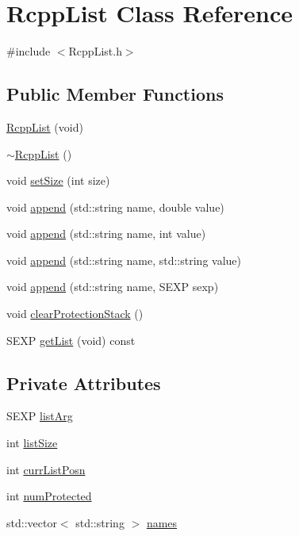 \hypertarget{classRcppList}{
\section{RcppList Class Reference}
\label{classRcppList}
}


{\ttfamily \#include $<$RcppList.h$>$}\subsection*{Public Member Functions}
\begin{DoxyCompactItemize}
\item 
\hyperlink{classRcppList_a833e37533d546d5855536a331f398fe9}{RcppList} (void)
\item 
\hyperlink{classRcppList_ad73b9a2282219d7b8501ce7d3841bffa}{$\sim$RcppList} ()
\item 
void \hyperlink{classRcppList_aa107c65834057ff79f5f8285ef5b1f3c}{setSize} (int size)
\item 
void \hyperlink{classRcppList_a259b0c48d68d995bcd906b8c1e8c970a}{append} (std::string name, double value)
\item 
void \hyperlink{classRcppList_a129144193234d87bcba6aed3acf53254}{append} (std::string name, int value)
\item 
void \hyperlink{classRcppList_a896d405a8a82cd6b5b9eaf2976bc54d6}{append} (std::string name, std::string value)
\item 
void \hyperlink{classRcppList_a01cb90a1561ce26bfbfb77b7d1f43a22}{append} (std::string name, SEXP sexp)
\item 
void \hyperlink{classRcppList_a164577340e23dd0811fc7057aa9aedec}{clearProtectionStack} ()
\item 
SEXP \hyperlink{classRcppList_a0d983805932608efbab2afecfd547ec4}{getList} (void) const 
\end{DoxyCompactItemize}
\subsection*{Private Attributes}
\begin{DoxyCompactItemize}
\item 
SEXP \hyperlink{classRcppList_abaa6e138e2c0153c8d95d7d7669e7330}{listArg}
\item 
int \hyperlink{classRcppList_a05ddf3e17ed3d9aebca235fccf15d383}{listSize}
\item 
int \hyperlink{classRcppList_a4b991902830e9f33eac03a42b2718195}{currListPosn}
\item 
int \hyperlink{classRcppList_a58644ce3af78cc421f04bafc3cc559b4}{numProtected}
\item 
std::vector$<$ std::string $>$ \hyperlink{classRcppList_ad718b4509024d31cc7e894518ce909dd}{names}
\end{DoxyCompactItemize}
